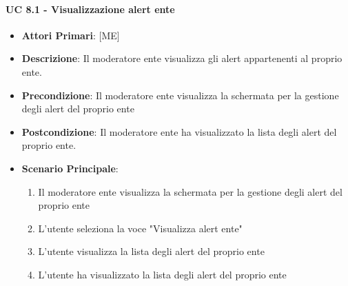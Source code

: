 			\paragraph{UC 8.1 - Visualizzazione alert ente}
			\begin{itemize}
				\item \textbf{Attori Primari}: [ME]
				\item \textbf{Descrizione}: Il moderatore ente visualizza gli alert appartenenti al proprio ente.
				\item \textbf{Precondizione}: Il moderatore ente visualizza la schermata per la gestione degli alert del proprio ente
				\item \textbf{Postcondizione}: Il moderatore ente ha visualizzato la lista degli alert del proprio ente.
				\item \textbf{Scenario Principale}:
				\begin{enumerate}
					\item{Il moderatore ente visualizza la schermata per la gestione degli alert del proprio ente}
					\item{L'utente seleziona la voce "Visualizza alert ente"}
					\item{L'utente visualizza la lista degli alert del proprio ente}
					\item{L'utente ha visualizzato la lista degli alert del proprio ente}
				\end{enumerate}	
			\end{itemize}
			
